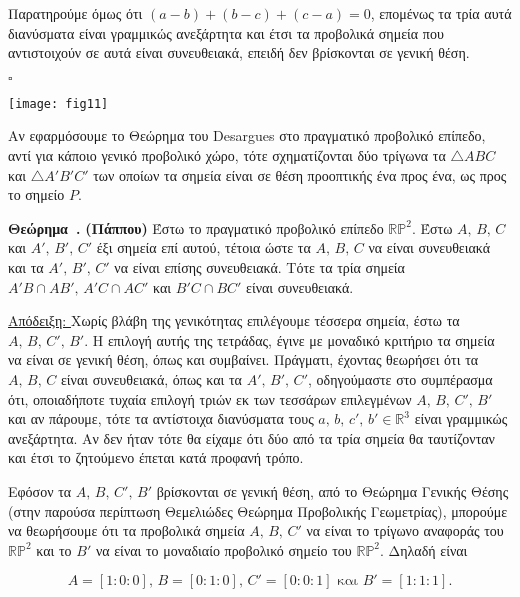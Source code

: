 \documentclass[12pt, a4paper]{book}
\newcounter{theorem}[section]
\newenvironment{theorem}[1][]{\refstepcounter{theorem}\par\medskip
   \textbf{Θεώρημα~\thetheorem. #1} \rmfamily}{\medskip}
\begin{document}
Παρατηρούμε όμως ότι $(a-b)+(b-c)+(c-a) = 0$, επομένως τα τρία αυτά διανύσματα είναι γραμμικώς ανεξάρτητα και έτσι τα προβολικά σημεία που αντιστοιχούν σε αυτά είναι συνευθειακά, επειδή δεν βρίσκονται σε γενική θέση.
  \begin{flushright}
  $\square$
  \end{flushright} 
  
\begin{center}
\texttt{[image: fig11]}
\end{center}
  
Αν εφαρμόσουμε το Θεώρημα του \textlatin{Desargues} στο πραγματικό προβολικό επίπεδο, αντί για κάποιο γενικό προβολικό χώρο, τότε σχηματίζονται δύο τρίγωνα τα $\triangle ABC$ και $\triangle A'B'C'$ των οποίων τα σημεία είναι σε θέση προοπτικής ένα προς ένα, ως προς το σημείο $P$.

\begin{theorem}\textbf{(Πάππου)}
Έστω το πραγματικό προβολικό επίπεδο $\mathbb{R}\mathbb{P}^2$.  Έστω $A,\, B,\, C$ και $A',\, B',\, C'$ έξι σημεία επί αυτού, τέτοια ώστε τα  $A,\, B,\, C$ να είναι συνευθειακά και τα $A',\, B',\, C'$ να είναι επίσης συνευθειακά. Τότε τα τρία σημεία $A'B \cap AB',\, A'C \cap AC'$ και $B'C \cap BC'$ είναι συνευθειακά.
\end{theorem}

\underline{Απόδειξη: } 
Χωρίς βλάβη της γενικότητας επιλέγουμε τέσσερα σημεία, έστω τα $A,\, B,\, C',\, B'$. Η επιλογή αυτής της τετράδας, έγινε με μοναδικό κριτήριο τα σημεία να είναι σε γενική θέση, όπως και συμβαίνει. Πράγματι, έχοντας θεωρήσει ότι τα $A,\, B,\, C$ είναι συνευθειακά, όπως και τα $A',\, B',\, C'$, οδηγούμαστε στο συμπέρασμα ότι, οποιαδήποτε τυχαία επιλογή τριών εκ των τεσσάρων επιλεγμένων $A,\, B,\, C',\, B'$ και αν πάρουμε, τότε τα αντίστοιχα διανύσματα τους $a,\, b,\, c',\,b' \in \mathbb{R}^3$ είναι γραμμικώς ανεξάρτητα. Αν δεν ήταν τότε θα είχαμε ότι δύο από τα τρία σημεία θα ταυτίζονταν και έτσι το ζητούμενο έπεται κατά προφανή τρόπο. 

Εφόσον τα $A,\, B,\, C',\, B'$ βρίσκονται σε γενική θέση, από το Θεώρημα Γενικής Θέσης (στην παρούσα περίπτωση Θεμελιώδες Θεώρημα Προβολικής Γεωμετρίας), μπορούμε να θεωρήσουμε ότι τα προβολικά σημεία $A,\, B,\, C'$ να είναι το τρίγωνο αναφοράς του $\mathbb{R}\mathbb{P}^2$ και το $B'$ να είναι το μοναδιαίο προβολικό σημείο του $\mathbb{R}\mathbb{P}^2$. Δηλαδή είναι

\begin{displaymath}
A = [1:0:0],\, B = [0:1:0],\, C' = [0:0:1] \text{ και } B' = [1:1:1].
\end{displaymath}
\end{document}
